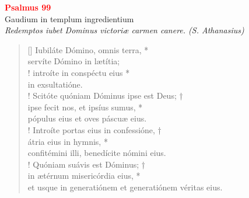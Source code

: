 


\def\greinitialformat#1{%
{\fontsize{39}{39}\selectfont #1}%
}




\vspace{0.3cm}
\begin{center}
 \textcolor{red}{\large \bf Psalmus 99}\\
Gaudium in templum ingredientium\\
\textit{\small Redemptos iubet Dominus victoriæ carmen canere. (S. Athanasius)}
\end{center}
\begin{verse}[\versewidth]
Iubiláte Dómino, omnis terra, *\\
servíte Dómino in lætítia;\\!
\vin introíte in conspéctu eius *\\
\vin in exsultatióne.\\!
Scitóte quóniam Dóminus ipse est Deus; †\\
ipse fecit nos, et ipsíus sumus, *\\
pópulus eius et oves páscuæ eius.\\!
\vin Introíte portas eius in confessióne, †\\
\vin átria eius in hymnis, *\\
\vin confitémini illi, benedícite nómini eius.\\!
Quóniam suávis est Dóminus; †\\
in ætérnum misericórdia eius, *\\
et usque in generatiónem et generatiónem véritas eius.\\
\end{verse}
\vspace{1cm}


